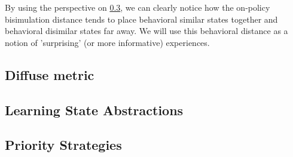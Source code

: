 By using the perspective on \ref{}, we can clearly notice how the on-policy bisimulation distance tends to place behavioral similar states together and behavioral disimilar states far away. We will use this behavioral distance as a notion of 'surprising' (or more informative) experiences.


\subsection{Diffuse metric}
\subsection{Learning State Abstractions}
\subsection{Priority Strategies}

